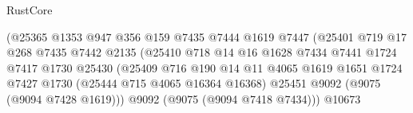 \begin{lexlean}{RustCore}
\begin{coremodule}
                                              (@25365
                                                @1353
                                                @947
                                                @356
                                                @159
                                                @7435
                                                @7444
                                                @1619
                                                @7447
                                                (@25401
                                                  @719
                                                  @17
                                                  @268
                                                  @7435
                                                  @7442
                                                  @2135
                                                  (@25410
                                                    @718
                                                    @14
                                                    @16
                                                    @1628
                                                    @7434
                                                    @7441
                                                    @1724
                                                    @7417
                                                    @1730
                                                    @25430
                                                    (@25409
                                                      @716
                                                      @190
                                                      @14
                                                      @11
                                                      @4065
                                                      @1619
                                                      @1651
                                                      @1724
                                                      @7427
                                                      @1730
                                                      (@25444 @715 @4065 @16364 @16368)
                                                      @25451
                                                      @9092
                                                      (@9075 (@9094 @7428 @1619)))
                                                    @9092
                                                    (@9075 (@9094 @7418 @7434)))
                                                  @10673

\end{coremodule}
\end{lexlean}
